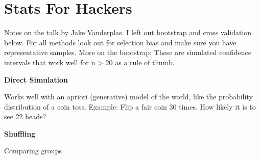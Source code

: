 \documentclass[]{book}
\newenvironment{Shaded}{\begin{snugshade}}{\end{snugshade}}
\newcommand{\KeywordTok}[1]{\textcolor[rgb]{0.13,0.29,0.53}{\textbf{#1}}}
\newcommand{\DataTypeTok}[1]{\textcolor[rgb]{0.13,0.29,0.53}{#1}}
\newcommand{\DecValTok}[1]{\textcolor[rgb]{0.00,0.00,0.81}{#1}}
\newcommand{\StringTok}[1]{\textcolor[rgb]{0.31,0.60,0.02}{#1}}
\newcommand{\OperatorTok}[1]{\textcolor[rgb]{0.81,0.36,0.00}{\textbf{#1}}}
\newcommand{\NormalTok}[1]{#1}
\begin{document}
\section{Stats For Hackers}\label{stats-for-hackers}

Notes on the talk by Jake Vanderplas. I left out bootstrap and cross
validation below. For all methods look out for selection bias and make
sure you have representative samples. More on the bootstrap: These are
simulated confidence intervals that work well for n \textgreater{} 20 as
a rule of thumb.

\textbf{Direct Simulation}

Works well with an apriori (generative) model of the world, like the
probability distribution of a coin toss. Example: Flip a fair coin 30
times. How likely it is to see 22 heads?

\begin{Shaded}
\end{Shaded}

\textbf{Shuffling}

Comparing groups

\begin{Shaded}
\end{Shaded}
\end{document}
